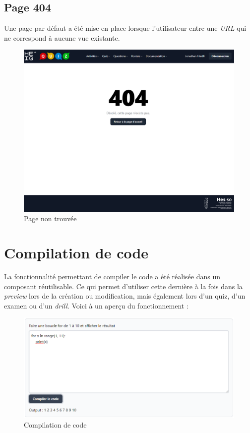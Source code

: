 \subsection{Page 404}
Une page par défaut a été mise en place lorsque l'utilisateur entre une \emph{URL} qui ne correspond à aucune vue existante.

\begin{center}
    \begin{figure}[H]
        \includegraphics[width=\textwidth]{./assets/figures/page404.png}
        \caption{Page non trouvée}
    \end{figure}
\end{center}


\section{Compilation de code}
La fonctionnalité permettant de compiler le code a été réalisée dans un composant réutilisable. Ce qui permet d'utiliser cette dernière à la fois dans la \emph{preview} lors de la création ou modification, mais également lors d'un quiz, d'un examen ou d'un \emph{drill}.
Voici à un aperçu du fonctionnement :
\begin{center}
    \begin{figure}[H]
        \includegraphics[width=\textwidth]{./assets/figures/codeCompilation.png}
        \caption{Compilation de code}
    \end{figure}
\end{center}

